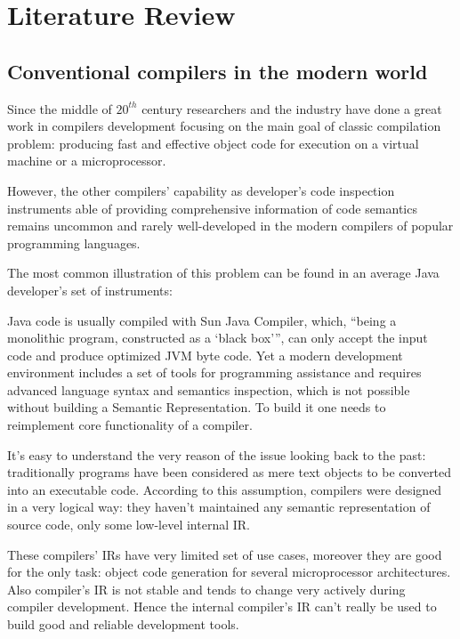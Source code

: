 \chapter{Literature Review}
\label{chap:lr}

\section{Conventional compilers in the modern world}
\label{sec:review_1}

Since the middle of $20^{th}$ century researchers and the industry have done a great
work in compilers development focusing on the main goal of classic compilation
problem: producing fast and effective object code for execution on a virtual
machine or a microprocessor.


However, the other compilers’ capability as developer’s code inspection
instruments able of providing comprehensive information of code semantics
remains uncommon and rarely well-developed in the modern compilers of
popular programming languages.


The most common illustration of this problem can be found in an average Java
developer’s set of instruments:

Java code is usually compiled with Sun Java Compiler, which, “being a
monolithic program, constructed as a ‘black box’”\cite{Zouev2005}, can only accept the input
code and produce optimized JVM byte code.
\newpage
Yet a modern development environment includes a set of tools for
programming assistance and requires advanced language syntax and
semantics inspection, which is not possible without building a Semantic
Representation\cite{Zouev2005}. To build it one needs to reimplement core functionality of a
compiler.


It’s easy to understand the very reason of the issue looking back to the past:
traditionally programs have been considered as mere text objects to be
converted into an executable code. According to this assumption, compilers
were designed in a very logical way: they haven’t maintained any semantic
representation of source code, only some low-level internal IR.


These compilers’ IRs have very limited set of use cases\cite{Zouev2005, Zouev2010}, moreover they are
good for the only task: object code generation for several microprocessor
architectures. Also compiler’s IR is not stable and tends to change very actively
during compiler development\cite{FreeSoftwareFoundation2016}. Hence the internal compiler’s IR can’t really
be used to build good and reliable development tools.


